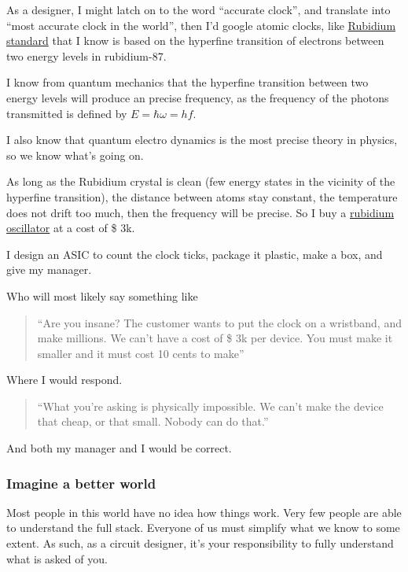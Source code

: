 As a designer, I might latch on to the word ``accurate clock'', and
translate into ``most accurate clock in the world'', then I'd google
atomic clocks, like
\href{https://en.wikipedia.org/wiki/Rubidium_standard}{Rubidium
standard} that I know is based on the hyperfine transition of electrons
between two energy levels in rubidium-87.

I know from quantum mechanics that the hyperfine transition between two
energy levels will produce an precise frequency, as the frequency of the
photons transmitted is defined by \(E = \hbar \omega = h f\).

I also know that quantum electro dynamics is the most precise theory in
physics, so we know what's going on.

As long as the Rubidium crystal is clean (few energy states in the
vicinity of the hyperfine transition), the distance between atoms stay
constant, the temperature does not drift too much, then the frequency
will be precise. So I buy a
\href{https://www2.mouser.com/ProductDetail/IQD/LFRBXO059244Bulk?qs=iw0hurA\%2FaD0K8weKx\%2Fu2ow\%3D\%3D}{rubidium
oscillator} at a cost of \$ 3k.

I design an ASIC to count the clock ticks, package it plastic, make a
box, and give my manager.

Who will most likely say something like

\begin{quote}
``Are you insane? The customer wants to put the clock on a wristband,
and make millions. We can't have a cost of \$ 3k per device. You must
make it smaller and it must cost 10 cents to make''
\end{quote}

Where I would respond.

\begin{quote}
``What you're asking is physically impossible. We can't make the device
that cheap, or that small. Nobody can do that.''
\end{quote}

And both my manager and I would be correct.

\subsubsection{Imagine a better world}\label{imagine-a-better-world}

Most people in this world have no idea how things work. Very few people
are able to understand the full stack. Everyone of us must simplify what
we know to some extent. As such, as a circuit designer, it's your
responsibility to fully understand what is asked of you.

